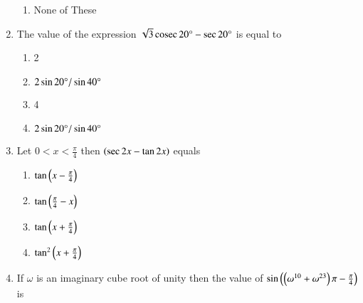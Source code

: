\begin{enumerate}[label=\thesubsection.\arabic*,ref=\thesubsection.\theenumi]
\begin{enumerate}
			\item None of These
  
 
		\end{enumerate}
	\item The value of the expression $\sqrt{3}\,\text{cosec}\, 20\degree - \sec 20\degree $ is equal to 
		\hfill{}
  
			\begin{enumerate}
				\item 2 
  				\item $2\sin 20\degree/\sin 40\degree$
  				\item 4 
				\item $2\sin 20\degree/\sin 40\degree $
			\end{enumerate}
  
    \item Let $0<x<\frac{\pi}{4}$ then $\left(\sec{2x} - \tan{2x}\right)$ equals
        
        \hfill{}
        \begin{enumerate}
                \item $\tan{\ensuremath{\left(x-\frac{\pi}{4}\right)}}$
                \item $\tan{\ensuremath{\left(\frac{\pi}{4}-x\right)}}$
                \item $\tan{\ensuremath{\left(x+\frac{\pi}{4}\right)}}$ 
                \item $\tan^{2}{\left(x+\frac{\pi}{4}\right)}$
        \end{enumerate}
    \item If $\omega$ is an imaginary cube root of unity then the value of $\sin{\ensuremath{\left(\left(\omega^{10} + \omega^{23}\right)\pi - \frac{\pi}{4}\right)}}$ is
    

\end{enumerate}
